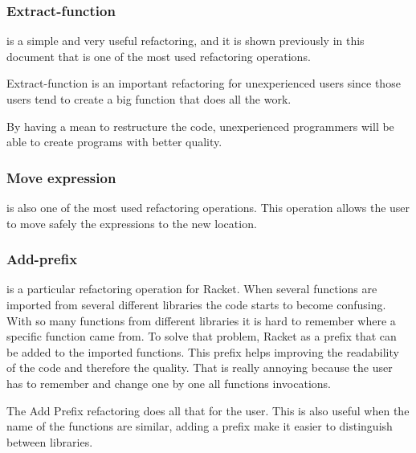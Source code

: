 \subsubsection{Extract-function}

is a simple and very useful refactoring, and it is shown previously in this document that is one of the most used refactoring operations.

Extract-function is an important refactoring for unexperienced users since those users tend to create a big function that does all the work.

By having a mean to restructure the code, unexperienced programmers will be able to create programs with better quality.




\subsubsection{Move expression}

is also one of the most used refactoring operations.
This operation allows the user to move safely the expressions to the new location.



\subsubsection{Add-prefix}
is a particular refactoring operation for Racket.
When several functions are imported from several different libraries the code starts to become confusing.
With so many functions from different libraries it is hard to remember where a specific function came from.
To solve that problem, Racket as a prefix that can be added to the imported functions.
This prefix helps improving the readability of the code and therefore the quality.
That is really annoying because the user has to remember and change one by one all functions invocations.

The Add Prefix refactoring does all that for the user.
This is also useful when the name of the functions are similar, adding a prefix make it easier to distinguish between libraries.





